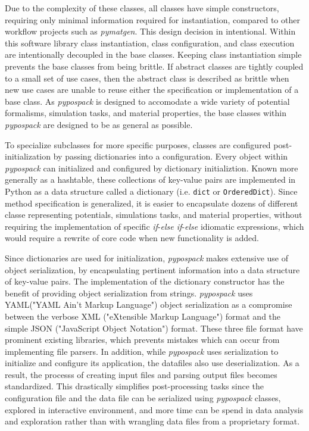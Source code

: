 Due to the complexity of these classes, all classes have simple constructors, requiring only minimal information required for instantiation, compared to other workflow projects such as \emph{pymatgen}.  This design decision in intentional.  Within this software library class instantiation, class configuration, and class execution are intentionally decoupled in the base classes.  Keeping class instantiation simple prevents the base classes from being brittle.  If abstract classes are tightly coupled to a small set of use cases, then the abstract class is described as brittle when new use cases are unable to reuse either the specification or implementation of a base class.  As \emph{pypospack} is designed to accomodate a wide variety of potential formalisms, simulation tasks, and material properties, the base classes within \emph{pypospack} are designed to be as general as possible.

To specialize subclasses for more specific purposes, classes are configured post-initialization by passing dictionaries into a configuration.  Every object within \emph{pypospack} can initialized and configured by dictionary initializtion.  Known more generally as a hashtable, these collections of key-value pairs are implemented in Python as a data structure called a dictionary (i.e. \verb|dict| or \verb|OrderedDict|).
  Since method specification is generalized, it is easier to encapsulate dozens of different classe representing potentials, simulations tasks, and material properties, without requiring the implementation of specific \emph{if}-\emph{else if}-\emph{else} idiomatic expressions, which would require a rewrite of core code when new functionality is added.

Since dictionaries are used for initialization, \emph{pypospack} makes extensive use of object serialization, by encapsulating pertinent information into a data structure of key-value pairs.
The implementation of the dictionary constructor has the benefit of providing object serialization from strings.  \emph{pypospack} uses YAML("YAML Ain't Markup Language")\cite{yaml_version_1_2r} object serialization as a compromise between the verbose XML ("eXtensible Markup Language") format and the simple JSON ("JavaScript Object Notation") format.  These three file format have prominent existing libraries, which prevents mistakes which can occur from implementing file parsers.
In addition, while \emph{pypospack} uses serialization to initialize and configure its application, the datafiles also use deserialization.  As a result, the processs of creating input files and parsing output files becomes standardized.  This drastically simplifies post-processing tasks since the configuration file and the data file can be serialized using \emph{pypospack} classes, explored in interactive environment, and more time can be spend in data analysis and exploration rather than with wrangling data files from a proprietary format.

